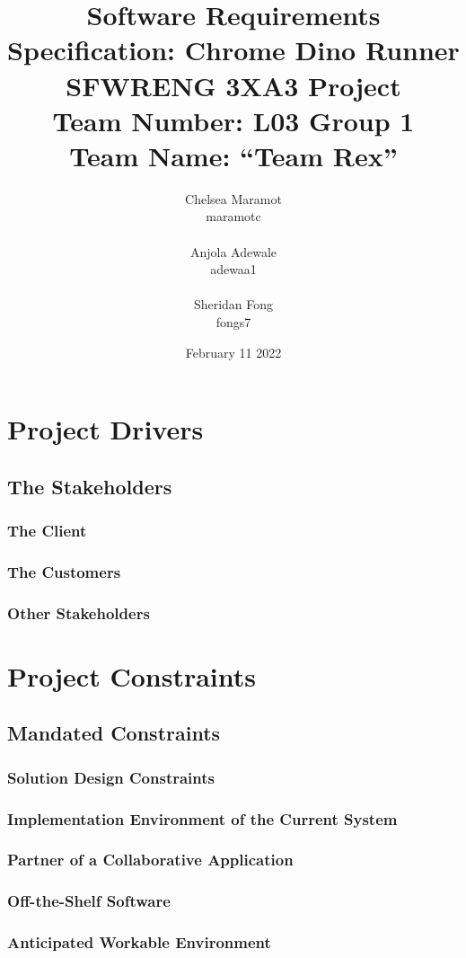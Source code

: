 \documentclass{article}
\title{Software Requirements Specification: Chrome Dino Runner \\ \bigskip \large SFWRENG 3XA3 Project \\ \bigskip \large Team Number: L03 Group 1 \\ \large Team Name: ``Team Rex'' }
\author{Chelsea Maramot \\ maramotc \\ \\ Anjola Adewale \\ adewaa1 \\ \\ Sheridan Fong \\ fongs7 }
\date{February 11 2022}
\begin{document}
\maketitle
\section{Project Drivers}
\subsection{The Stakeholders}
\subsubsection{The Client}
\subsubsection{The Customers}
\subsubsection{Other Stakeholders}



\section{Project Constraints}

\subsection{Mandated Constraints}
\subsubsection{Solution Design Constraints}
\subsubsection{Implementation Environment of the Current System}
\subsubsection{Partner of a Collaborative Application}
\subsubsection{Off-the-Shelf Software}
\subsubsection{Anticipated Workable Environment}
\end{document}
